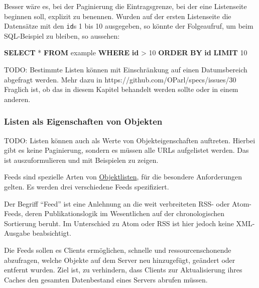 \documentclass[,a4paper]{article}
\newenvironment{Shaded}{}{}
\newcommand{\KeywordTok}[1]{\textcolor[rgb]{0.00,0.44,0.13}{\textbf{{#1}}}}
\newcommand{\DecValTok}[1]{\textcolor[rgb]{0.25,0.63,0.44}{{#1}}}
\newcommand{\NormalTok}[1]{{#1}}
\begin{document}
Besser wäre es, bei der Paginierung die Eintragsgrenze, bei der eine
Listenseite beginnen soll, explizit zu benennen. Wurden auf der ersten
Listenseite die Datensätze mit den \texttt{id}s 1 bis 10 ausgegeben, so
könnte der Folgeaufruf, um beim SQL-Beispiel zu bleiben, so aussehen:

\begin{Shaded}
\begin{Highlighting}[]
\KeywordTok{SELECT} \NormalTok{* }\KeywordTok{FROM} \NormalTok{example }\KeywordTok{WHERE} \KeywordTok{id} \NormalTok{> }\DecValTok{10} \KeywordTok{ORDER} \KeywordTok{BY} \KeywordTok{id} \KeywordTok{LIMIT} \DecValTok{10}
\end{Highlighting}
\end{Shaded}

TODO: Bestimmte Listen können mit Einschränkung auf einen Datumsbereich
abgefragt werden. Mehr dazu in https://github.com/OParl/specs/issues/30
Fraglich ist, ob das in diesem Kapitel behandelt werden sollte oder in
einem anderen.

\subsubsection{Listen als Eigenschaften von
Objekten}\label{listen-als-eigenschaften-von-objekten}

TODO: Listen können auch als Werte von Objekteigenschaften auftreten.
Hierbei gibt es keine Paginierung, sondern es müssen alle URLs
aufgelistet werden. Das ist auszuformulieren und mit Beispielen zu
zeigen.


Feeds sind spezielle Arten von \hyperref[objektlisten]{Objektlisten},
für die besondere Anforderungen gelten. Es werden drei verschiedene
Feeds spezifiziert.

Der Begriff ``Feed'' ist eine Anlehnung an die weit verbreiteten RSS-
oder Atom-Feeds, deren Publikationslogik im Wesentlichen auf der
chronologischen Sortierung beruht. Im Unterschied zu Atom oder RSS ist
hier jedoch keine XML-Ausgabe beabsichtigt.

Die Feeds sollen es Clients ermöglichen, schnelle und
ressourcenschonende abzufragen, welche Objekte auf dem Server neu
hinzugefügt, geändert oder entfernt wurden. Ziel ist, zu verhindern,
dass Clients zur Aktualisierung ihres Caches den gesamten Datenbestand
eines Servers abrufen müssen.
\end{document}
